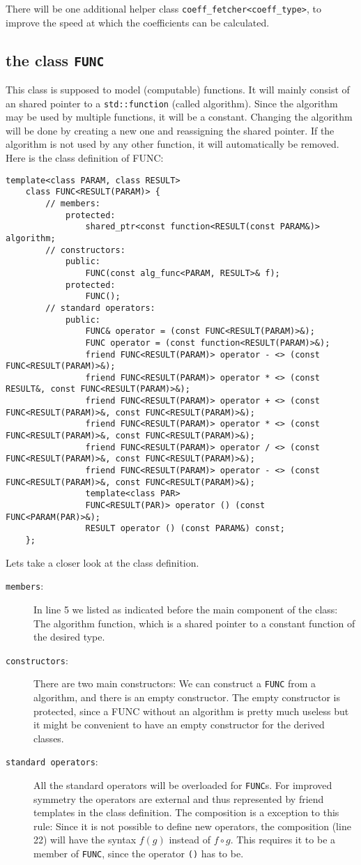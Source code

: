 \documentclass{article}
\newcommand{\code}[1]{\texttt{#1}}
\newcommand{\func}[1]{\texttt{#1}}
\begin{document}
There will be one additional helper class \func{coeff\_fetcher<coeff\_type>}, to improve the speed at which the coefficients can be calculated.

\subsection{the class \texttt{FUNC}}

This class is supposed to model (computable) functions. It will mainly consist of an shared pointer to a \texttt{std::function} (called algorithm). Since the algorithm may be used by multiple functions, it will be a constant. Changing the algorithm will be done by creating a new one and reassigning the shared pointer. If the algorithm is not used by any other function, it will automatically be removed. Here is the class definition of FUNC:
\begin{lstlisting}
template<class PARAM, class RESULT>
	class FUNC<RESULT(PARAM)> {
		// members:
			protected:
				shared_ptr<const function<RESULT(const PARAM&)> algorithm;
		// constructors:
			public:
				FUNC(const alg_func<PARAM, RESULT>& f);
			protected:
				FUNC();
		// standard operators:
			public:
				FUNC& operator = (const FUNC<RESULT(PARAM)>&);
				FUNC operator = (const function<RESULT(PARAM)>&);
				friend FUNC<RESULT(PARAM)> operator - <> (const FUNC<RESULT(PARAM)>&);
				friend FUNC<RESULT(PARAM)> operator * <> (const RESULT&, const FUNC<RESULT(PARAM)>&);
				friend FUNC<RESULT(PARAM)> operator + <> (const FUNC<RESULT(PARAM)>&, const FUNC<RESULT(PARAM)>&);
				friend FUNC<RESULT(PARAM)> operator * <> (const FUNC<RESULT(PARAM)>&, const FUNC<RESULT(PARAM)>&);
				friend FUNC<RESULT(PARAM)> operator / <> (const FUNC<RESULT(PARAM)>&, const FUNC<RESULT(PARAM)>&);
				friend FUNC<RESULT(PARAM)> operator - <> (const FUNC<RESULT(PARAM)>&, const FUNC<RESULT(PARAM)>&);
				template<class PAR>
				FUNC<RESULT(PAR)> operator () (const FUNC<PARAM(PAR)>&);
				RESULT operator () (const PARAM&) const;
	};
\end{lstlisting}
Lets take a closer look at the class definition.
\begin{description}
\item[\code{members}:] In line 5 we listed as indicated before the main component of the class: The algorithm function, which is a shared pointer to a constant function of the desired type.
\item[\code{constructors}:] There are two main constructors: We can construct a \func{FUNC} from a algorithm, and there is an empty constructor. The empty constructor is protected, since a FUNC without an algorithm is pretty much useless but it might be convenient to have an empty constructor for the derived classes.
\item[\code{standard operators}:] All the standard operators will be overloaded for \func{FUNC}s. For improved symmetry the operators are external and thus represented by friend templates in the class definition. The composition is a exception to this rule: Since it is not possible to define new operators, the composition (line 22) will have the syntax $f(g)$ instead of $f\circ g$. This requires it to be a member of \func{FUNC}, since the operator \code{()} has to be.
\end{description}
\end{document}
